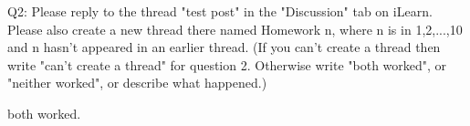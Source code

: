 \documentclass{article}
\begin{document}
Q2: Please reply to the thread "test post" in the "Discussion" tab on
iLearn. Please also create a new thread there named Homework n, where
n is in {1,2,...,10} and n hasn't appeared in an earlier thread. (If
you can't create a thread then write "can't create a thread" for
question 2. Otherwise write "both worked", or "neither worked", or
describe what happened.)

both worked.
\end{document}
